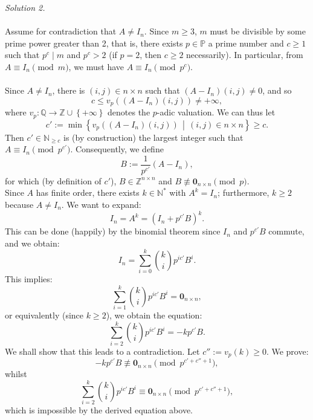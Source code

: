 \documentclass[11pt, a4paper, oneside]{article}
\theoremstyle{remark}
\theoremstyle{lemma}
\begin{document}
\newpage
\textit{Solution 2.}
\\\\
Assume for contradiction that \( A \neq I_n \). Since \( m \geq 3 \), \( m \) must be divisible by some prime power greater than 2, that is, there exists \( p \in \mathbb{P} \) a prime number and \( c \geq 1 \) such that \( p^c \mid m \) and \( p^c > 2 \) (if \( p = 2 \), then \( c \geq 2 \) necessarily). In particular, from \( A \equiv I_n \pmod{m} \), we must have \( A \equiv I_n \pmod{p^c} \).
\\\\
Since \( A \neq I_n \), there is \( (i,j) \in n \times n \) such that \( \left( A - I_n \right)(i,j) \neq 0 \), and so 
\[
c \leq v_p\left( \left( A - I_n \right)(i,j) \right) \neq +\infty,
\]
where \( v_p \colon \mathbb{Q} \rightarrow \mathbb{Z} \cup \left\{ +\infty \right\} \) denotes the \( p \)-adic valuation. We can thus let 
\[
c' := \min\left\{ v_p\left( \left( A - I_n \right)(i,j) \right) \,\middle\vert\, (i,j) \in n \times n \right\} \geq c.
\]
Then \( c' \in \mathbb{N}_{\geq c} \) is (by construction) the largest integer such that \( A \equiv I_n \pmod{p^{c'}} \). Consequently, we define 
\[
B := \frac{1}{p^{c'}} \left( A - I_n \right),
\]
for which (by definition of \( c' \)), \( B \in \mathbb{Z}^{n \times n} \) and \( B \not\equiv \mathbf{0}_{n \times n} \pmod{p} \).
\\
Since \( A \) has finite order, there exists \( k \in \mathbb{N}^{*} \) with \( A^k = I_n \); furthermore, \( k \geq 2 \) because \( A \neq I_n \). We want to expand:
\[
I_n = A^k = \left( I_n + p^{c'} B \right)^k.
\]
This can be done (happily) by the binomial theorem since \( I_n \) and \( p^{c'} B \) commute, and we obtain:
\[
I_n = \sum_{i=0}^{k} \binom{k}{i} p^{i c'} B^i.
\]
This implies:
\[
\sum_{i=1}^{k} \binom{k}{i} p^{i c'} B^i = \mathbf{0}_{n \times n},
\]
or equivalently (since \( k \geq 2 \)), we obtain the equation:
\[
\sum_{i=2}^{k} \binom{k}{i} p^{i c'} B^i = -k p^{c'} B.
\]
We shall show that this leads to a contradiction. Let \( c'' := v_p(k) \geq 0 \). We prove:
\begin{equation}
-k p^{c'} B \not\equiv \mathbf{0}_{n \times n} \pmod{p^{c' + c'' + 1}},
\end{equation}
\label{1}
whilst
\begin{equation}
\sum_{i=2}^{k} \binom{k}{i} p^{i c'} B^i \equiv \mathbf{0}_{n \times n} \pmod{p^{c' + c'' + 1}},
\end{equation}
\label{2}
which is impossible by the derived equation above.
\\
\end{document}
